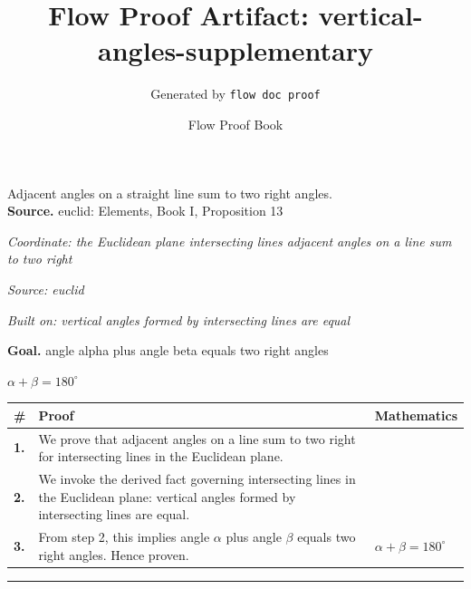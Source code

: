 \documentclass[11pt]{article}
\title{Flow Proof Artifact: vertical-angles-supplementary}
\author{Generated by \texttt{flow doc proof}}
\date{Flow Proof Book}
\theoremstyle{definition}
\begin{document}
\maketitle
Adjacent angles on a straight line sum to two right angles.\\[0.5em]
\textbf{Source.} euclid: Elements, Book I, Proposition 13\\[0.5em]
\bigskip
{}\par
\smallskip\noindent\textit{Coordinate: the Euclidean plane \cdot intersecting lines \cdot adjacent angles on a line sum to two right}\par
\smallskip\noindent\textit{Source: euclid}\par
\smallskip\noindent\textit{Built on: vertical angles formed by intersecting lines are equal}\par
\medskip
\noindent\textbf{Goal.} angle alpha plus angle beta equals two right angles\par
\noindent$\displaystyle \alpha + \beta = 180^\circ$\par
\medskip
\noindent
\begin{tabular}{@{} >{\raggedright\arraybackslash}p{} >{\raggedright\arraybackslash}p{} >{\raggedleft\arraybackslash}p{} @{}}
\textbf{\#} & \textbf{Proof} & \textbf{Mathematics} \\
\midrule
\textbf{1.} & We prove that adjacent angles on a line sum to two right for intersecting lines in the Euclidean plane. & \\[0.45em]
\textbf{2.} & We invoke the derived fact governing intersecting lines in the Euclidean plane: vertical angles formed by intersecting lines are equal. & \\[0.45em]
\textbf{3.} & From step 2, this implies angle $\alpha$ plus angle $\beta$ equals two right angles. Hence proven. & $\displaystyle \alpha + \beta = 180^\circ$ \\[0.45em]
\bottomrule
\end{tabular}
\label{thm:Geometry-intersecting lines-adjacent_angles_on_a_line_sum_to_two_right}
\par\medskip\hrule
\end{document}
